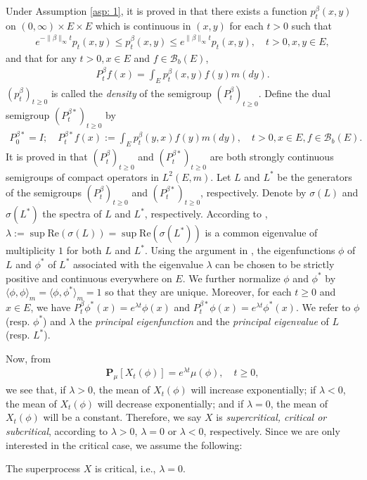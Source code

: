 	Under Assumption \ref{asp: 1}, it is proved in
	\cite{RenSongZhang2015Limit, RenSongZhang2017Central}
	that there exists a function $p^\beta_t(x,y)$ on $(0,\infty) \times E \times E$ which is continuous in $(x,y)$ for each $t>0$ such that
\begin{align}
	e^{-\|\beta\|_\infty t} p_t(x,y)
	\leq p^{\beta}_t(x,y)
	\leq e^{\|\beta\|_\infty t} p_t(x,y),
	\quad t>0, x, y\in E,
\end{align}
	and that for any $t>0, x\in E$ and $f \in \mathscr B_b(E)$,
\begin{align}
	P^\beta_t f(x)
	= \int_E p_t^\beta (x,y) f(y) m(dy).
\end{align}
    $(p^\beta_t)_{t\geq 0}$ is called the
    \emph{density}  of the semigroup $(P^\beta_t)_{t\geq 0}$.
	Define the dual semigroup $(P^{\beta *}_t)_{t \geq 0}$ by
\begin{align}
	P^{\beta *}_0 = I;
	\quad P^{\beta *}_t f(x)
	:= \int_E p^\beta_t (y,x) f(y) m(dy),
	\quad t>0, x\in E, f\in \mathscr B_b(E).
\end{align}
	It is proved in
	\cite{RenSongZhang2015Limit, RenSongZhang2017Central}
	that $(P^\beta_t)_{t \geq 0}$ and $(P^{\beta *}_t)_{t \geq 0}$ are both strongly continuous semigroups of compact operators in $L^2(E,m)$.
	Let $L$ and $L^*$ be the generators of the semigroups $(P^\beta_t)_{t \geq 0}$ and $(P^{\beta *}_t)_{t \geq 0}$, respectively.
	Denote by $\sigma(L)$ and $\sigma(L^*)$ the spectra of $L$ and $L^*$, respectively.
	According to \cite[Theorem V.6.6]{Schaefer1974Banach},
	$\lambda := \sup \text{Re}(\sigma(L)) = \sup \text{Re}(\sigma(L^*))$ is a common eigenvalue of multiplicity $1$ for both $L$ and $L^*$.
	Using the argument in \cite{RenSongZhang2015Limit}, the eigenfunctions $\phi$ of $L$ and $\phi^*$ of $L^*$ associated with the eigenvalue $\lambda$ can be chosen to be strictly positive and continuous everywhere on $E$.
	We further normalize $\phi$ and $\phi^*$ by $\langle\phi, \phi\rangle_m = \langle\phi,\phi^*\rangle_m = 1$ so that they are unique.
	Moreover, for each $t\geq 0$ and $x\in E$, we have $P^\beta_t \phi^*(x) = e^{\lambda t} \phi(x)$ and $P^{\beta *}_t \phi(x) = e^{\lambda t} \phi^*(x)$.
	We refer to $\phi$ (resp. $\phi^*$) and $\lambda$ the \emph{principal eigenfunction} and the \emph{principal eigenvalue} of $L$ (resp. $L^*$).
	
	Now, from
\begin{align}
	\mathbf P_\mu[X_t(\phi)]
	= e^{\lambda t} \mu(\phi),
	\quad t \geq 0,
\end{align}
	we see that, if $\lambda > 0$, the mean of $X_t(\phi)$ will increase exponentially; if $\lambda < 0$, the mean of $X_t(\phi)$ will decrease exponentially; and if $\lambda = 0$, the mean of $X_t(\phi)$ will be a constant.
	Therefore, we say $X$ is \emph{supercritical, critical or subcritical}, according to $\lambda > 0$, $\lambda = 0$ or $\lambda < 0$, respectively.
	Since we are only interested in the critical case, we assume the following:
\begin{asp} \label{asp: 2}
    The superprocess $X$ is critical, i.e., $\lambda = 0$.
\end{asp}

